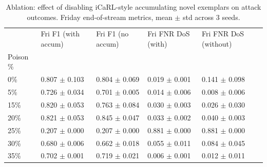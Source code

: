 \begin{table}
\caption{Ablation: effect of disabling iCaRL-style accumulating novel exemplars on attack outcomes. Friday end-of-stream metrics, mean $\pm$ std across 3 seeds.}
\label{tab:ablation-exemplars}
\begin{tabular}{lllll}
\toprule
 & Fri F1 (with accum) & Fri F1 (no accum) & Fri FNR DoS (with) & Fri FNR DoS (without) \\
Poison \% &  &  &  &  \\
\midrule
0\% & 0.807 $\pm$ 0.103 & 0.804 $\pm$ 0.069 & 0.019 $\pm$ 0.001 & 0.141 $\pm$ 0.098 \\
5\% & 0.726 $\pm$ 0.034 & 0.701 $\pm$ 0.005 & 0.014 $\pm$ 0.006 & 0.008 $\pm$ 0.006 \\
15\% & 0.820 $\pm$ 0.053 & 0.763 $\pm$ 0.084 & 0.030 $\pm$ 0.003 & 0.026 $\pm$ 0.030 \\
20\% & 0.821 $\pm$ 0.053 & 0.845 $\pm$ 0.047 & 0.033 $\pm$ 0.002 & 0.040 $\pm$ 0.003 \\
25\% & 0.207 $\pm$ 0.000 & 0.207 $\pm$ 0.000 & 0.881 $\pm$ 0.000 & 0.881 $\pm$ 0.000 \\
30\% & 0.680 $\pm$ 0.006 & 0.662 $\pm$ 0.018 & 0.055 $\pm$ 0.011 & 0.084 $\pm$ 0.045 \\
35\% & 0.702 $\pm$ 0.001 & 0.719 $\pm$ 0.021 & 0.006 $\pm$ 0.001 & 0.012 $\pm$ 0.011 \\
\bottomrule
\end{tabular}
\end{table}
